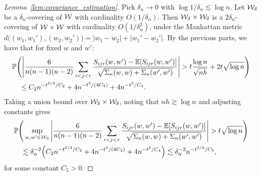 \begin{proof}[Lemma~\ref{lem:covariance_estimation}]

  Pick $\delta_n \to 0$
  with $\log 1/\delta_n \lesssim \log n$.
  Let $\mathcal{W}_\delta$ be a $\delta_n$-covering of $\mathcal{W}$
  with cardinality $O(1/\delta_n)$.
  Then $\mathcal{W}_\delta \times \mathcal{W}_\delta$
  is a $2\delta_n$-covering of $\mathcal{W} \times \mathcal{W}$
  with cardinality $O(1/\delta_n^2)$,
  under the Manhattan metric
  $d\big((w_1, w_1'), (w_2, w_2')\big)
  = |w_1 - w_2| + |w_1' - w_2'|$.
  By the previous parts,
  we have that for fixed $w$ and $w'$:
  \begin{align*}
    &\mathbb{P}\Bigg(
    \Bigg|
    \frac{6}{n(n-1)(n-2)}
    \sum_{i<j<r}
    \frac{S_{ijr}(w,w') - \mathbb{E}[S_{ijr}(w,w')]}
      {\sqrt{\Sigma_n(w,w) + \Sigma_n(w',w')}}
    \Bigg|
    > t \frac{\log n}{\sqrt{nh}}
    + 2t \sqrt{\log n}
    \Bigg) \\
    &\quad\leq
    C_2 n^{-t^{2/3} / C_2}
    + 4 n^{-t^2 / (4C_3)}
    + 4 n^{-t^2 / C_4}.
  \end{align*}
  Taking a union bound over $\mathcal{W}_\delta \times \mathcal{W}_\delta$,
  noting that $nh \gtrsim \log n$
  and adjusting constants gives
  \begin{align*}
    &\mathbb{P}\Bigg(
    \sup_{w, w' \in \mathcal{W}_\delta}
    \Bigg|
    \frac{6}{n(n-1)(n-2)}
    \sum_{i<j<r}
    \frac{S_{ijr}(w,w') - \mathbb{E}[S_{ijr}(w,w')]}
      {\sqrt{\Sigma_n(w,w) + \Sigma_n(w',w')}}
    \Bigg|
    > t \sqrt{\log n}
    \Bigg) \\
    &\quad\lesssim
    \delta_n^{-2}
    \Big(
    C_2 n^{-t^{2/3} / C_2}
    + 4 n^{-t^2 / (4C_3)}
    + 4 n^{-t^2 / C_4}
    \Big)
    \lesssim
    \delta_n^{-2}
    n^{-t^{2/3} / C_5},
  \end{align*}
  for some constant $C_5 > 0$.



\end{proof}
